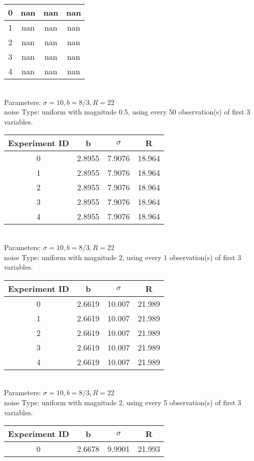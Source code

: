 \begin{multicols}{3}
\begin{tabular}{cccc}
0 & nan & nan & nan\\ \hline 
 1 & nan & nan & nan\\ \hline 
 2 & nan & nan & nan\\ \hline 
 3 & nan & nan & nan\\ \hline 
 4 & nan & nan & nan\\ \hline 
 \end{tabular}\\
Parameters: $\sigma=10, b=8/3, R=22$\\
noise Type: uniform with magnitude 0.5, using every 50 observation(s) of first 3 variables.\\
\begin{tabular}{cccc}
\hline Experiment ID & b & $\sigma$ & R \\ \hline 
0 & 2.8955 & 7.9076 & 18.964\\ \hline 
 1 & 2.8955 & 7.9076 & 18.964\\ \hline 
 2 & 2.8955 & 7.9076 & 18.964\\ \hline 
 3 & 2.8955 & 7.9076 & 18.964\\ \hline 
 4 & 2.8955 & 7.9076 & 18.964\\ \hline 
 \end{tabular}\\
Parameters: $\sigma=10, b=8/3, R=22$\\
noise Type: uniform with magnitude 2, using every 1 observation(s) of first 3 variables.\\
\begin{tabular}{cccc}
\hline Experiment ID & b & $\sigma$ & R \\ \hline 
0 & 2.6619 & 10.007 & 21.989\\ \hline 
 1 & 2.6619 & 10.007 & 21.989\\ \hline 
 2 & 2.6619 & 10.007 & 21.989\\ \hline 
 3 & 2.6619 & 10.007 & 21.989\\ \hline 
 4 & 2.6619 & 10.007 & 21.989\\ \hline 
 \end{tabular}\\
Parameters: $\sigma=10, b=8/3, R=22$\\
noise Type: uniform with magnitude 2, using every 5 observation(s) of first 3 variables.\\
\begin{tabular}{cccc}
\hline Experiment ID & b & $\sigma$ & R \\ \hline 
0 & 2.6678 & 9.9901 & 21.993\\ \hline 

\end{tabular}
\end{multicols}
